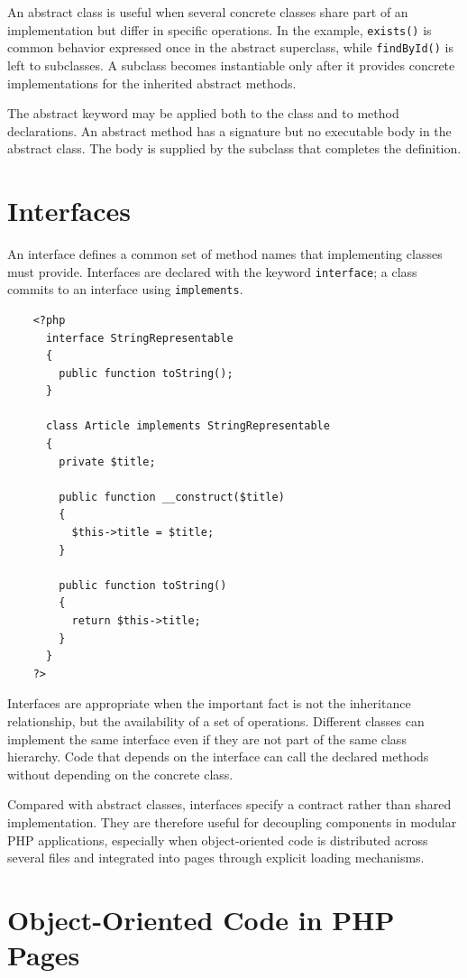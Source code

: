 \documentclass{scrbook}
\begin{document}
	An abstract class is useful when several concrete classes share part of an implementation but differ in specific operations. In the example, \texttt{exists()} is common behavior expressed once in the abstract superclass, while \texttt{findById()} is left to subclasses. A subclass becomes instantiable only after it provides concrete implementations for the inherited abstract methods.
	
	The abstract keyword may be applied both to the class and to method declarations. An abstract method has a signature but no executable body in the abstract class. The body is supplied by the subclass that completes the definition.
	
	\section{Interfaces}
	
	An interface defines a common set of method names that implementing classes must provide. Interfaces are declared with the keyword \texttt{interface}; a class commits to an interface using \texttt{implements}.
	
	\begin{lstlisting}
	<?php
	  interface StringRepresentable
	  {
		public function toString();
	  }
	
	  class Article implements StringRepresentable
	  {
		private $title;
	
		public function __construct($title)
		{
		  $this->title = $title;
		}
	
		public function toString()
		{
		  return $this->title;
		}
	  }
	?>
	\end{lstlisting}
	
	Interfaces are appropriate when the important fact is not the inheritance relationship, but the availability of a set of operations. Different classes can implement the same interface even if they are not part of the same class hierarchy. Code that depends on the interface can call the declared methods without depending on the concrete class.
	
	Compared with abstract classes, interfaces specify a contract rather than shared implementation. They are therefore useful for decoupling components in modular PHP applications, especially when object-oriented code is distributed across several files and integrated into pages through explicit loading mechanisms.
	
	\section{Object-Oriented Code in PHP Pages}
	
\end{document}
